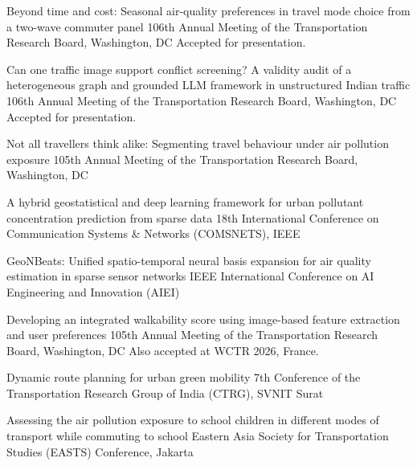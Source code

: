 \documentclass[10pt, a4paper]{article}
\begin{document}
\begin{cvlist}
    {Beyond time and cost: Seasonal air-quality preferences in travel mode choice from a two-wave
     commuter panel}
    {106th Annual Meeting of the Transportation Research Board, Washington, DC}
    {Accepted for presentation.}

    {Can one traffic image support conflict screening? A validity audit of a heterogeneous graph
     and grounded LLM framework in unstructured Indian traffic}
    {106th Annual Meeting of the Transportation Research Board, Washington, DC}
    {Accepted for presentation.}

    {Not all travellers think alike: Segmenting travel behaviour under air pollution exposure}
    {105th Annual Meeting of the Transportation Research Board, Washington, DC}{}

    {A hybrid geostatistical and deep learning framework for urban pollutant concentration
     prediction from sparse data}
    {18th International Conference on Communication Systems \& Networks (COMSNETS), IEEE}
    {}

    {GeoNBeats: Unified spatio-temporal neural basis expansion for air quality estimation in
     sparse sensor networks}
    {IEEE International Conference on AI Engineering and Innovation (AIEI)}
    {}

    {Developing an integrated walkability score using image-based feature extraction and user
     preferences}
    {105th Annual Meeting of the Transportation Research Board, Washington, DC}
    {Also accepted at WCTR 2026, France.}

    {Dynamic route planning for urban green mobility}
    {7th Conference of the Transportation Research Group of India (CTRG), SVNIT Surat}{}

    {Assessing the air pollution exposure to school children in different modes of transport while
     commuting to school}
    {Eastern Asia Society for Transportation Studies (EASTS) Conference, Jakarta}{}


\end{cvlist}
\end{document}
